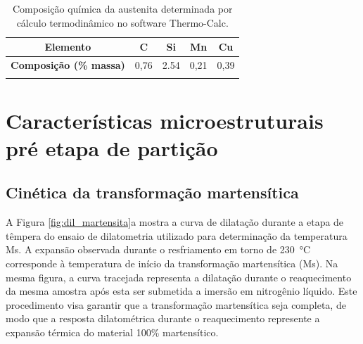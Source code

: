 \begin{table}
  \caption{Composição química da austenita determinada por cálculo termodinâmico no software Thermo-Calc\textregistered{}.}
  \begin{tabular}{c c c c c}
  \thickhline
  \textbf{Elemento} & C & Si & Mn & Cu\\
  \hline
  \textbf{Composição (\% massa)} & 0,76 & 2.54 & 0,21 & 0,39\\
  \thickhline
  \end{tabular}
  \label{tab:CQaust}
\end{table}

\section{Características microestruturais pré etapa de partição}

\label{sec:pre_particao}

\subsection{Cinética da transformação martensítica}

A Figura \ref{fig:dil_martensita}a mostra a curva de dilatação durante a etapa de têmpera do ensaio de dilatometria utilizado para determinação da temperatura Ms. A expansão observada durante o resfriamento em torno de \SI{230}{\degreeCelsius} corresponde à temperatura de início da transformação martensítica (Ms). 
Na mesma figura, a curva tracejada representa a dilatação durante o reaquecimento da mesma amostra após esta ser submetida a imersão em nitrogênio líquido. Este procedimento visa garantir que a transformação martensítica seja completa, de modo que a resposta dilatométrica durante o reaquecimento represente a expansão térmica do material 100\% martensítico.

